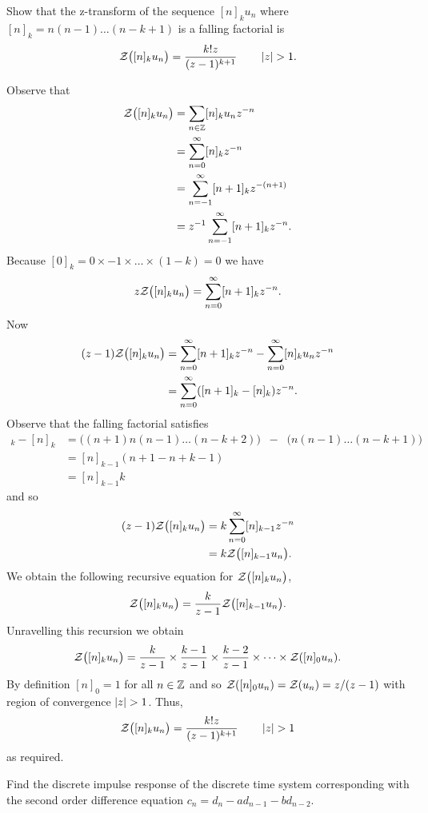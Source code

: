 \begin{excersizelist}
\item \label{exer:fallingfacztransform} Show that the z-transform of the sequence $[n]_k u_n$ where $[n]_k = n(n-1)\dots(n-k+1)$ is a falling factorial is
\[
{\mathcal Z}\big( [n]_k u_n  \big) = \frac{k! z }{(z - 1)^{k+1}} \qquad \left\vert z \right\vert > 1.
\]
\begin{solution}
Observe that
\begin{align*}
{\mathcal Z}\big( [n]_{k} u_n  \big) &= \sum_{n\in{\mathbb Z}} [n]_k u_n z^{-n} \\ 
&= \sum_{n=0}^\infty [n]_k z^{-n} \\ 
&= \sum_{n=-1}^\infty [n+1]_k z^{-(n+1)} \\
&= z^{-1} \sum_{n=-1}^\infty [n+1]_k z^{-n}.
\end{align*}
Because $[0]_k = 0 \times -1 \times \dots \times (1-k)= 0$ we have
\[
z {\mathcal Z}\big( [n]_{k} u_n  \big) = \sum_{n=0}^\infty [n+1]_k z^{-n}.
\]  
Now
\begin{align*}
(z - 1) {\mathcal Z}\big( [n]_{k} u_n  \big) &= \sum_{n=0}^\infty [n+1]_k z^{-n} - \sum_{n=0}^\infty [n]_k u_n z^{-n} \\
&= \sum_{n=0}^\infty ([n+1]_k - [n]_k) z^{-n}.
\end{align*}
Observe that the falling factorial satisfies
\begin{align*}
[n+1]_k - [n]_k &= \big( (n+1)n(n-1)\dots(n-k+2) \big) \;\;  - \;\; \big(n(n-1)\dots(n-k+1)\big) \\
&= [n]_{k-1}(n+1 - n+k-1) \\
&= [n]_{k-1} k
\end{align*}
and so
\begin{align*}
(z - 1) {\mathcal Z}\big( [n]_{k} u_n  \big) &= k \sum_{n=0}^\infty  [n]_{k-1} z^{-n} \\
&= k {\mathcal Z}\big( [n]_{k-1} u_n  \big).
\end{align*}
We obtain the following recursive equation for ${\mathcal Z}\big( [n]_{k} u_n  \big)$,
\[
{\mathcal Z}\big( [n]_{k} u_n  \big) = \frac{k}{z-1} {\mathcal Z}\big( [n]_{k-1} u_n  \big).
\]
Unravelling this recursion we obtain
\[
{\mathcal Z}\big( [n]_{k} u_n  \big) = \frac{k}{z-1} \times \frac{k-1}{z-1} \times \frac{k-2}{z-1} \times \dots \times {\mathcal Z}( [n]_0 u_n ).
\]
By definition $[n]_0 = 1$ for all $n \in {\mathbb Z}$ and so ${\mathcal Z}( [n]_0 u_n ) = {\mathcal Z}( u_n ) = z/(z-1)$ with region of convergence $\left\vert z \right\vert >1$.  Thus,
\[
{\mathcal Z}\big( [n]_{k} u_n  \big) = \frac{k! z}{(z-1)^{k+1}} \qquad \left\vert z \right\vert > 1
\]
as required.
\end{solution}

\item \label{exer:findimpulseresponsesecondorderdiscrete} Find the discrete impulse response of the discrete time system corresponding with the second order difference equation $c_n = d_n - a d_{n-1} - b d_{n-2}$. 


\end{excersizelist}
